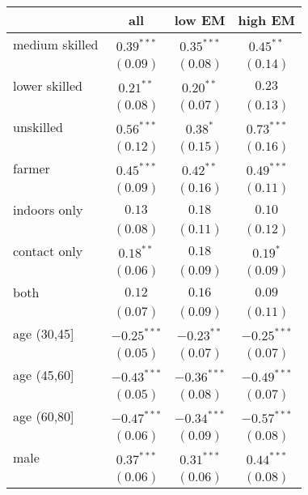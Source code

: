 
\begin{table}[h!]
\begin{center}
\begin{small}
\begin{tabular}{l c c c}
\hline
 & all & low EM & high EM \\
\hline
medium skilled & $0.39^{***}$  & $0.35^{***}$  & $0.45^{**}$   \\
               & $(0.09)$      & $(0.08)$      & $(0.14)$      \\
lower skilled  & $0.21^{**}$   & $0.20^{**}$   & $0.23$        \\
               & $(0.08)$      & $(0.07)$      & $(0.13)$      \\
unskilled      & $0.56^{***}$  & $0.38^{*}$    & $0.73^{***}$  \\
               & $(0.12)$      & $(0.15)$      & $(0.16)$      \\
farmer         & $0.45^{***}$  & $0.42^{**}$   & $0.49^{***}$  \\
               & $(0.09)$      & $(0.16)$      & $(0.11)$      \\
indoors only   & $0.13$        & $0.18$        & $0.10$        \\
               & $(0.08)$      & $(0.11)$      & $(0.12)$      \\
contact only   & $0.18^{**}$   & $0.18$        & $0.19^{*}$    \\
               & $(0.06)$      & $(0.09)$      & $(0.09)$      \\
both           & $0.12$        & $0.16$        & $0.09$        \\
               & $(0.07)$      & $(0.09)$      & $(0.11)$      \\
age (30,45]    & $-0.25^{***}$ & $-0.23^{**}$  & $-0.25^{***}$ \\
               & $(0.05)$      & $(0.07)$      & $(0.07)$      \\
age (45,60]    & $-0.43^{***}$ & $-0.36^{***}$ & $-0.49^{***}$ \\
               & $(0.05)$      & $(0.08)$      & $(0.07)$      \\
age (60,80]    & $-0.47^{***}$ & $-0.34^{***}$ & $-0.57^{***}$ \\
               & $(0.06)$      & $(0.09)$      & $(0.08)$      \\
male           & $0.37^{***}$  & $0.31^{***}$  & $0.44^{***}$  \\
               & $(0.06)$      & $(0.06)$      & $(0.08)$      \\

\end{tabular}
\end{small}
\end{center}
\end{table}
